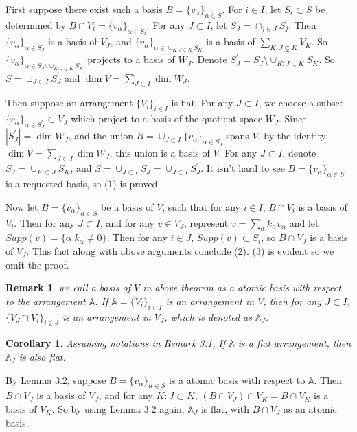 \def\CTEXPreproc{Created by ctex v0.2.12, don't edit!}\documentclass[11pt]{article}
\newtheorem{cor}{Corollary}[section]
\newtheorem{rem}{Remark}[section]
\begin{document}
\begin{pf}
First suppose there exist such a basis $B= \{ v_{\alpha } \}_{\alpha \in S } $. For $i\in I$, let $S_i \subset S $ be determined by $B\cap V_i = \{ v_{\alpha } \}_{\alpha \in S_i }$. For any $J\subset I$, let $S_J = \cap _{j \in J} S_j $. Then
$\{ v_{\alpha}  \}_{\alpha \in S_J  }$ is a basis of $V_J$, and $\{ v_{\alpha } \}_{ \alpha \in  \cup_{K: J\subsetneq K} S_K }  $ is a basis of $\sum_{ K: J\subsetneq K } V_K $. So $\{ v_{\alpha} \}_{ \alpha \in S_J \setminus  \cup_{K: J\subsetneq K} S_K }$ projects to a
basis of $W_J$. Denote $S^{'} _{J} = S_{J} \setminus \cup_{K: J\subsetneq K} S_K $.  So $S = \sqcup _{J\subset I} S^{'} _{J}$ and
$\dim V = \sum _{J\subset I} \dim W_J $.

 Then suppose an arrangement $\{ V_i \}_{i\in I}$ is flat. For any $J
 \subset I$, we choose a subset $\{  v_{\alpha } \}_{\alpha \in S^{'} _J }  \subset V_J  $ which project to a basis of the quotient space $W_J$.
 Since $| S^{'} _J  | = \dim W_J $, and the union $B= \cup _{J\subset I } \{ v_{\alpha }  \}_{\alpha \in S^{'} _J }   $ spans $V$, by the
 identity $\dim V = \sum _{J\subset I} \dim W_J$, this union is a basis of $V$. For any $J\subset I$, denote
 $S_J = \cup_{K\subset J } S^{'} _K $, and $S= \cup _{J\subset I} S_J = \cup _{J\subset I} S^{'} _J $. It isn't hard to see
 $B= \{  v_{\alpha} \}_{\alpha \in S } $ is a requested basis, so (1) is proved.

 Now let $B=\{ v_{\alpha} \}_{\alpha \in S}$ be a basis of $V$, such that for any $i\in I$, $B\cap V_i$ is a basis of $V_i$.  Then for any
 $J\subset I$, and for any $v\in V_J$, represent $v= \sum_{\alpha} k_{\alpha} v_{\alpha} $ and  let $Supp(v)=\{ \alpha | k_{\alpha}\neq 0 \}$. Then for any $i\in J$, $Supp(v)\subset S_i $, so $B\cap V_J$ is a basis of $V_J$. This fact along with above arguments conclude (2). (3) is evident so we omit the proof.

\end{pf}

\begin{rem}
we call a basis of $V$ in above theorem as a atomic basis with respect to the arrangement $\mathbb{A}$.
If $\mathbb{A}=\{ V_i \}_{i\in I}$ is an arrangement in $V$,  then for any $J\subset I$, $\{ V_J \cap V_i \}_{i\notin J }  $ is an arrangement in $V_J $, which is denoted  as $\mathbb{A}_J $.
\end{rem}

\begin{cor} Assuming notations in Remark 3.1, If $\mathbb{A}$ is a flat arrangement, then $\mathbb{A}_J $ is also flat.
\end{cor}
\begin{pf}
By Lemma 3.2, suppose $B= \{ v_{\alpha } \}_{\alpha \in S }$ is a atomic basis with respect to $\mathbb{A}$. Then $B\cap V_J $ is a basis of $V_J$, and for any $K: J\subset K$, $(B\cap V_J ) \cap V_K = B\cap V_K $ is a basis of $V_K$. So by using Lemma 3.2 again, $\mathbb{A}_J$ is flat, with $B\cap V_J $ as an atomic basis.
\end{pf}
\end{document}
